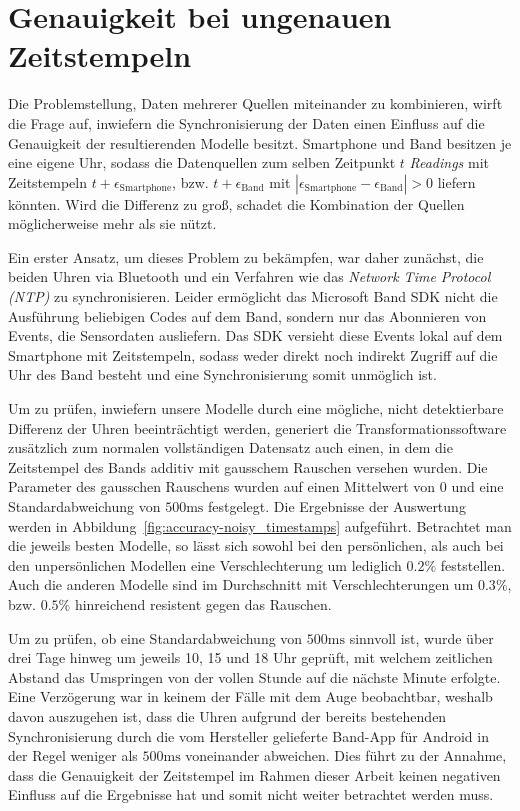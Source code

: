 \section{Genauigkeit bei ungenauen Zeitstempeln}
Die Problemstellung, Daten mehrerer Quellen miteinander zu kombinieren, wirft die Frage auf, inwiefern die Synchronisierung der Daten einen Einfluss auf die Genauigkeit der resultierenden Modelle besitzt. Smartphone und Band besitzen je eine eigene Uhr, sodass die Datenquellen zum selben Zeitpunkt $t$ \textit{Readings} mit Zeitstempeln $t + \epsilon_\text{Smartphone}$, bzw. $t + \epsilon_\text{Band}$ mit $|\epsilon_\text{Smartphone} - \epsilon_\text{Band}| > 0$ liefern könnten. Wird die Differenz zu groß, schadet die Kombination der Quellen möglicherweise mehr als sie nützt.

Ein erster Ansatz, um dieses Problem zu bekämpfen, war daher zunächst, die beiden Uhren via Bluetooth und ein Verfahren wie das \textit{Network Time Protocol (NTP)} \cite{Mills} zu synchronisieren. Leider ermöglicht das Microsoft Band SDK nicht die Ausführung beliebigen Codes auf dem Band, sondern nur das Abonnieren von Events, die Sensordaten ausliefern. Das SDK versieht diese Events lokal auf dem Smartphone mit Zeitstempeln, sodass weder direkt noch indirekt Zugriff auf die Uhr des Band besteht und eine Synchronisierung somit unmöglich ist.

Um zu prüfen, inwiefern unsere Modelle durch eine mögliche, nicht detektierbare Differenz der Uhren beeinträchtigt werden, generiert die Transformationssoftware zusätzlich zum normalen vollständigen Datensatz auch einen, in dem die Zeitstempel des Bands additiv mit gausschem Rauschen versehen wurden. Die Parameter des gausschen Rauschens wurden auf einen Mittelwert von $0$ und eine Standardabweichung von $500 \text{ms}$ festgelegt. Die Ergebnisse der Auswertung werden in Abbildung~\ref{fig:accuracy-noisy_timestamps} aufgeführt. Betrachtet man die jeweils besten Modelle, so lässt sich sowohl bei den persönlichen, als auch bei den unpersönlichen Modellen eine Verschlechterung um lediglich $0.2 \%$ feststellen. Auch die anderen Modelle sind im Durchschnitt mit Verschlechterungen um $0.3 \%$, bzw. $0.5 \%$ hinreichend resistent gegen das Rauschen.

Um zu prüfen, ob eine Standardabweichung von $500 \text{ms}$ sinnvoll ist, wurde über drei Tage hinweg um jeweils 10, 15 und 18 Uhr geprüft, mit welchem zeitlichen Abstand das Umspringen von der vollen Stunde auf die nächste Minute erfolgte. Eine Verzögerung war in keinem der Fälle mit dem Auge beobachtbar, weshalb davon auszugehen ist, dass die Uhren aufgrund der bereits bestehenden Synchronisierung durch die vom Hersteller gelieferte Band-App für Android in der Regel weniger als $500 \text{ms}$ voneinander abweichen. Dies führt zu der Annahme, dass die Genauigkeit der Zeitstempel im Rahmen dieser Arbeit keinen negativen Einfluss auf die Ergebnisse hat und somit nicht weiter betrachtet werden muss.


